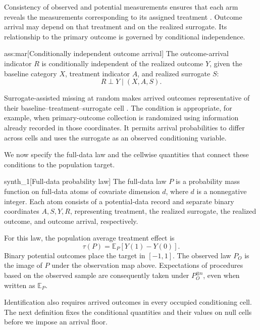 \documentclass[11pt]{article}
\begin{document}
Consistency of observed and potential measurements ensures that each arm reveals the measurements corresponding to its assigned treatment \citep{KallusMao2025}. Outcome arrival may depend on that treatment and on the realized surrogate. Its relationship to the primary outcome is governed by conditional independence.

\begin{assumptionv}{ass:mar}[Conditionally independent outcome arrival]
The outcome-arrival indicator \(R\) is conditionally independent of the realized outcome \(Y\), given the baseline category \(X\), treatment indicator \(A\), and realized surrogate \(S\):
\[
R\perp Y\mid(X,A,S).
\]
\end{assumptionv}

Surrogate-assisted missing at random makes arrived outcomes representative of their baseline--treatment--surrogate cell \citep{KallusMao2025}. The condition is appropriate, for example, when primary-outcome collection is randomized using information already recorded in those coordinates. It permits arrival probabilities to differ across cells and uses the surrogate as an observed conditioning variable.

We now specify the full-data law and the cellwise quantities that connect these conditions to the population target.

\begin{definitionv}{synth_1}[Full-data probability law]
The full-data law \(P\) is a probability mass function on full-data atoms of covariate dimension \(d\), where \(d\) is a nonnegative integer. Each atom consists of a potential-data record and separate binary coordinates \(A,S,Y,R\), representing treatment, the realized surrogate, the realized outcome, and outcome arrival, respectively.
\end{definitionv}

For this law, the population average treatment effect  is
\[
\tau(P)=\mathbb E_P\!\left[Y(1)-Y(0)\right].
\]
Binary potential outcomes place the target in \([-1,1]\). The observed law \(P_O\) is the image of \(P\) under the observation map above. Expectations of procedures based on the observed sample are consequently taken under \(P_O^{\otimes n}\), even when written as \(\mathbb E_P\).

Identification also requires arrived outcomes in every occupied conditioning cell. The next definition fixes the conditional quantities and their values on null cells before we impose an arrival floor.
\end{document}
